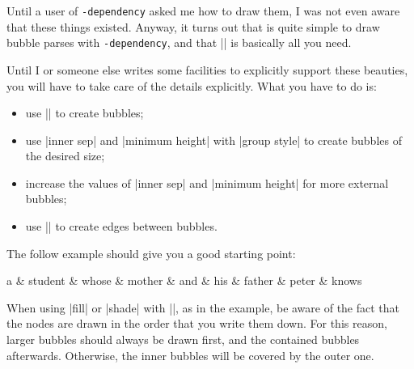 \documentclass[a4paper]{ltxdoc}
\def\pkgname{\tikzname{}\texttt{-dependency}}
\begin{document}
Until a user of \pkgname{} asked me how to draw them, I was not even aware that these things existed. Anyway, it turns out that is quite simple to draw bubble parses with \pkgname{}, and that |\wordgroup| is basically all you need.

Until I or someone else writes some facilities to explicitly support these beauties, you will have to take care of the details explicitly. What you have to do is:
\begin{itemize}
   \item use |\wordgroup| to create bubbles;
   \item use |inner sep| and |minimum height| with |group style| to create bubbles of the desired size;
   \item increase the values of |inner sep| and |minimum height| for more external bubbles;
   \item use |\groupedge| to create edges between bubbles.
\end{itemize}
\noindent The follow example should give you a good starting point:

\begin{codeexample}[]
\begin{dependency}[hide label, arc edge,
      edge vertical padding=-2pt,
      group style=outer bubble]
   \begin{deptext}[column sep=1.4em]
      a \& student \& whose \& mother \& and \& his \& father \& peter \& knows \\
   \end{deptext}
    
    
    
\end{dependency}%
\end{codeexample}

When using |fill| or |shade| with |\wordgroup|, as in the example, be aware of the fact that the nodes are drawn in the order that you write them down. For this reason, larger bubbles should always be drawn first, and the contained bubbles afterwards. Otherwise, the inner bubbles will be covered by the outer one.
\end{document}
